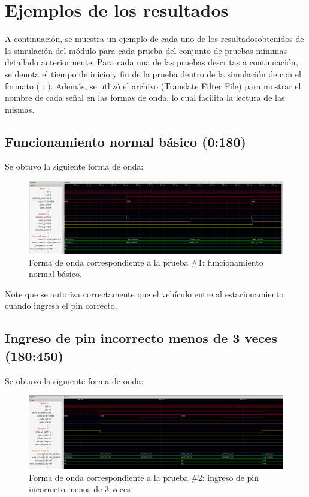 \section{Ejemplos de los resultados}
A continuación, se muestra un ejemplo de cada uno de los resultadosobtenidos de la simulación del módulo  para cada prueba del conjunto de pruebas mínimas detallado anteriormente. 
Para cada una de las pruebas descritas a continuación, se denota el tiempo de inicio y fin de la prueba dentro de la simulación de  con el formato ( : ).
Además, se utlizó el archivo  (Translate Filter File) para mostrar el nombre de cada señal en las formas de onda, lo cual facilita la lectura de las mismas.

\subsection{Funcionamiento normal básico (0:180)}
Se obtuvo la siguiente forma de onda:

\begin{figure}[!h]
    \centering
    \includegraphics[width = \linewidth]{figs/prueba1.png}
    \caption{Forma de onda correspondiente a la prueba \#1: funcionamiento normal básico.}
    \label{fig3}
\end{figure}

Note que se autoriza correctamente que el vehículo entre al estacionamiento cuando ingresa el pin correcto.  

\newpage

\subsection{Ingreso de pin incorrecto menos de 3 veces (180:450)}
Se obtuvo la siguiente forma de onda:

\begin{figure}[!h]
    \centering
    \includegraphics[width = \linewidth]{figs/prueba2.png}
    \caption{Forma de onda correspondiente a la prueba \#2: ingreso de pin incorrecto menos de 3 veces}
    \label{fig4}
\end{figure}

